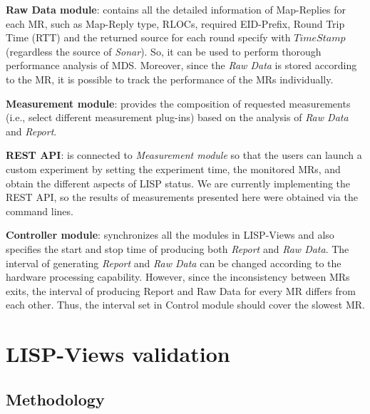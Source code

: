 \textbf{Raw Data module}: contains all the detailed information of Map-Replies for each MR, such as Map-Reply type, RLOCs, required EID-Prefix, Round Trip Time (RTT) and the returned source for each round specify with $Time Stamp$ (regardless the source of \emph{Sonar}).  So, it can be used to perform thorough performance analysis of MDS. Moreover, since the \emph{Raw Data} is stored according to the MR, it is possible to track the performance of the MRs individually.

\textbf{Measurement module}: provides the composition of requested measurements (i.e., select different measurement plug-ins) based on the analysis of \emph{Raw Data} and \emph{Report}.

\textbf{REST API}: is connected to \emph{Measurement module} so that the users can launch a custom experiment by setting the experiment time, the monitored MRs, and obtain the different aspects of LISP status.  We are currently implementing the REST API, so the results of measurements presented here were obtained via the command lines.

\textbf{Controller module}: synchronizes all the modules in LISP-Views and also specifies the start and stop time of producing both \emph{Report} and \emph{Raw Data}. The interval of generating \emph{Report} and \emph{Raw Data} can be changed according to the hardware processing capability. However, since the inconsistency between MRs exits, the interval of producing Report and Raw Data for every MR differs from each other. Thus, the interval set in Control module should cover the slowest MR. 


\section{LISP-Views validation}
\label{sec:lispviews_evaluation}


\subsection{Methodology}
\label{sec:lispviews_evaluation_meth}

